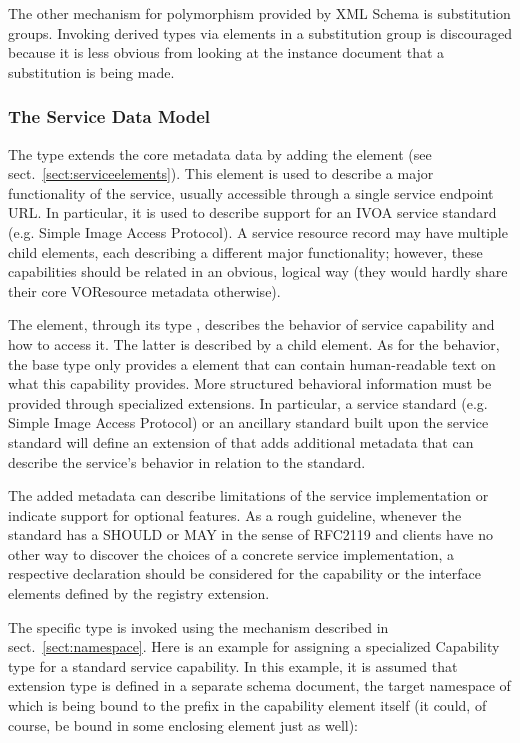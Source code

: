 \documentclass[11pt,a4paper]{ivoa}
\begin{document}
The other mechanism for polymorphism provided by XML Schema is
substitution groups.  Invoking derived  types via
elements in a substitution group is discouraged because it is less
obvious from looking at the instance document that a substitution is
being made.


\subsubsection{The Service Data Model}
\label{sect:servicemodel}


The  type extends the core 
metadata data by adding the  element (see
sect.~\ref{sect:serviceelements}).  This element is used to describe a major
functionality of the service, usually accessible through a single
service endpoint URL.  In particular, it is used to describe support for
an IVOA service standard (e.g. Simple Image Access Protocol).  A service
resource record may have multiple child  elements,
each describing a different major functionality; however, these
capabilities should be related in an obvious, logical way (they would
hardly share their core VOResource metadata otherwise).

The  element, through its type ,
describes the behavior of service capability and how to access it.  The
latter is described by a child  element.  As for the
behavior, the base  type only provides a
 element that can contain human-readable text on what
this capability provides.  More structured behavioral information must
be provided through specialized  extensions.  In
particular, a service standard (e.g. Simple Image
Access Protocol) or an ancillary standard built upon the service
standard will define an extension of  that
adds additional metadata that can describe the service's behavior in
relation to the standard.

The added metadata can describe
limitations of the service implementation or indicate support for
optional features.  As a rough guideline, whenever the standard has a
SHOULD or MAY in the sense of RFC2119 and clients have no other way to
discover the choices of a concrete service implementation, a respective
declaration should be considered for the capability or the interface
elements defined by the registry extension.

The specific  type is invoked
using the  mechanism described in
sect.~\ref{sect:namespace}.
Here is an example for assigning a specialized Capability type for
a standard service capability.  In this example, it is assumed that
 extension type is defined in a separate
schema document, the target namespace of which is being bound to the
 prefix in the capability element itself (it could, of
course, be bound in some enclosing element just as well):
\end{document}

